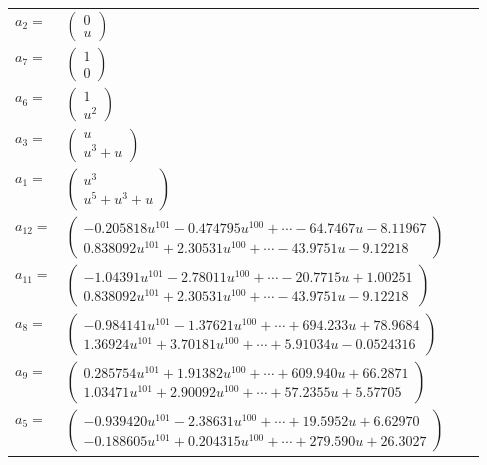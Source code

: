 \documentclass[1p]{elsarticle_modified}
\theoremstyle{definition}
\begin{document}
\begin{tabular}{m{7pt} m{180pt} m{7pt} m{180pt} }
\flushright $a_{2}=$&$\begin{pmatrix}0\\u\end{pmatrix}$ \\
\flushright $a_{7}=$&$\begin{pmatrix}1\\0\end{pmatrix}$ \\
\flushright $a_{6}=$&$\begin{pmatrix}1\\u^2\end{pmatrix}$ \\
\flushright $a_{3}=$&$\begin{pmatrix}u\\u^3+u\end{pmatrix}$ \\
\flushright $a_{1}=$&$\begin{pmatrix}u^3\\u^5+u^3+u\end{pmatrix}$ \\
\flushright $a_{12}=$&$\begin{pmatrix}-0.205818 u^{101}-0.474795 u^{100}+\cdots-64.7467 u-8.11967\\0.838092 u^{101}+2.30531 u^{100}+\cdots-43.9751 u-9.12218\end{pmatrix}$ \\
\flushright $a_{11}=$&$\begin{pmatrix}-1.04391 u^{101}-2.78011 u^{100}+\cdots-20.7715 u+1.00251\\0.838092 u^{101}+2.30531 u^{100}+\cdots-43.9751 u-9.12218\end{pmatrix}$ \\
\flushright $a_{8}=$&$\begin{pmatrix}-0.984141 u^{101}-1.37621 u^{100}+\cdots+694.233 u+78.9684\\1.36924 u^{101}+3.70181 u^{100}+\cdots+5.91034 u-0.0524316\end{pmatrix}$ \\
\flushright $a_{9}=$&$\begin{pmatrix}0.285754 u^{101}+1.91382 u^{100}+\cdots+609.940 u+66.2871\\1.03471 u^{101}+2.90092 u^{100}+\cdots+57.2355 u+5.57705\end{pmatrix}$ \\
\flushright $a_{5}=$&$\begin{pmatrix}-0.939420 u^{101}-2.38631 u^{100}+\cdots+19.5952 u+6.62970\\-0.188605 u^{101}+0.204315 u^{100}+\cdots+279.590 u+26.3027\end{pmatrix}$ \\

\end{tabular}
\end{document}

